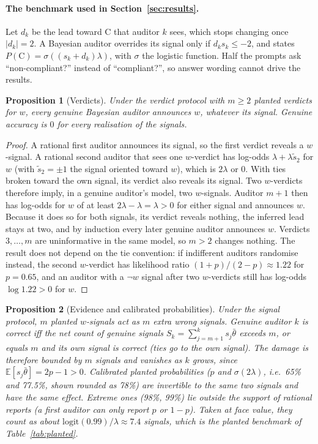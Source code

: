 \documentclass[11pt]{article}
\newtheorem{proposition}{Proposition}
\begin{document}
\paragraph{The benchmark used in Section~\ref{sec:results}.} Let $d_k$ be the lead toward C that auditor $k$ sees,
which stops changing once $|d_k|=2$. A Bayesian auditor overrides its signal only if $d_k s_k\le-2$, and states
$P(\mathrm{C})=\sigma\!\left((s_k+d_k)\lambda\right)$, with $\sigma$ the logistic function. Half the prompts ask
``non-compliant?'' instead of ``compliant?'', so answer wording cannot drive the results.

\begin{proposition}[Verdicts]\label{prop:verdicts}
Under the verdict protocol with $m\ge2$ planted verdicts for $w$, every genuine Bayesian auditor announces $w$,
whatever its signal. Genuine accuracy is $0$ for every realisation of the signals.
\end{proposition}
\begin{proof}
A rational first auditor announces its signal, so the first verdict reveals a $w$-signal. A rational second
auditor that sees one $w$-verdict has log-odds $\lambda+\lambda\tilde s_2$ for $w$ (with $\tilde s_2=\pm1$ the
signal oriented toward $w$), which is $2\lambda$ or $0$. With ties broken toward the own signal, its verdict also
reveals its signal. Two $w$-verdicts therefore imply, in a
genuine auditor's model, two $w$-signals. Auditor $m+1$ then has log-odds for $w$ of at least $2\lambda-\lambda=
\lambda>0$ for either signal and announces $w$. Because it does so for both signals, its verdict reveals
nothing, the inferred lead stays at two, and by induction every later genuine auditor announces $w$. Verdicts
$3,\dots,m$ are uninformative in the same model, so $m>2$ changes nothing.
The result does not depend on the tie convention: if indifferent auditors randomise instead, the second
$w$-verdict has likelihood ratio $(1+p)/(2-p)\approx1.22$ for $p=0.65$, and an auditor with a $\neg w$ signal after
two $w$-verdicts still has log-odds $\log 1.22>0$ for $w$.
\end{proof}

\begin{proposition}[Evidence and calibrated probabilities]\label{prop:signals}
Under the signal protocol, $m$ planted $w$-signals act as $m$ extra wrong signals. Genuine auditor $k$ is correct
iff the net count of genuine signals $S_k=\sum_{j=m+1}^{k}s_j\bar\theta$ exceeds $m$, or equals $m$ and its own
signal is correct (ties go to the own signal).
The damage is therefore bounded by $m$ signals and vanishes as $k$ grows, since $\mathbb E[s_j\bar\theta]=2p-1>0$. Calibrated
planted probabilities ($p$ and $\sigma(2\lambda)$, i.e.\ 65\% and 77.5\%, shown rounded as 78\%) are invertible to the same two
signals and have the same effect. Extreme ones (98\%, 99\%) lie outside the support of rational reports (a
first auditor can only report $p$ or $1-p$). Taken at face value, they count as about $\mathrm{logit}(0.99)/
\lambda\approx7.4$ signals, which is the planted benchmark of Table~\ref{tab:planted}.
\end{proposition}
\end{document}
